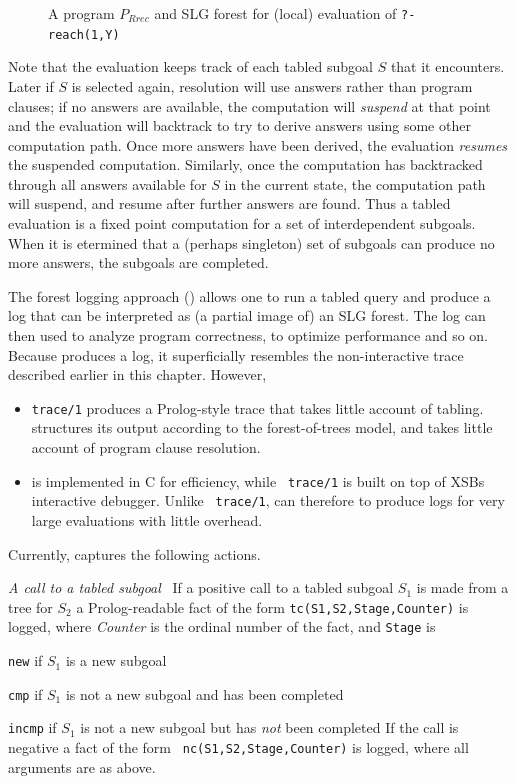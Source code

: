 \begin{example}
\begin{figure}[htbp]
\caption{A program $P_{Rrec}$ and SLG forest for (local) evaluation of
  {\tt ?- reach(1,Y)}} \label{fig:local}
\end{figure}
%
Note that the evaluation keeps track of each tabled subgoal $S$ that
it encounters.  Later if $S$ is selected again, resolution will use
answers rather than program clauses; if no answers are available, the
computation will {\em suspend} at that point and the evaluation will
backtrack to try to derive answers using some other computation path.
Once more answers have been derived, the evaluation {\em resumes} the
suspended computation.  Similarly, once the computation has
backtracked through all answers available for $S$ in the current
state, the computation path will suspend, and resume after further
answers are found.  Thus a tabled evaluation is a fixed point
computation for a set of interdependent subgoals.  When it is
etermined that a (perhaps singleton) set of subgoals can produce no
more answers, the subgoals are completed.
\end{example}


The forest logging approach ({\tt \ctrace}) allows one to run a tabled
query and produce a log that can be interpreted as (a partial image
of) an SLG forest.  The log can then used to analyze program
correctness, to optimize performance and so on.  Because \ctrace{}
  produces a log, it superficially resembles the non-interactive trace
  described earlier in this chapter.  However,
\begin{itemize}
\item {\tt trace/1} produces a Prolog-style trace that takes little
  account of tabling.  \ctrace{} structures its output according to
  the forest-of-trees model, and takes little account of program
  clause resolution.

\item \ctrace{} is implemented in C for efficiency, while {\tt
  trace/1} is built on top of XSBs interactive debugger.  Unlike {\tt
  trace/1}, \ctrace{} can therefore to produce logs for very large
  evaluations with little overhead.
\end{itemize}

Currently, \ctrace{} captures the following actions.

\bi
\item {\em A call to a tabled subgoal}~ If a positive call to a tabled
  subgoal $S_1$ is made from a tree for $S_2$ a Prolog-readable fact
  of the form {\tt tc(S1,S2,Stage,Counter)} is logged, where {\em
    Counter} is the ordinal number of the fact, and {\tt Stage} is
\bi
\item {\tt new} if $S_1$ is a new subgoal
\item {\tt cmp} if $S_1$ is not a new subgoal and has been completed
\item {\tt incmp} if $S_1$ is not a new subgoal but has {\em not} been
  completed 
\ei 
%
If the call is negative a fact of the form {\tt
  nc(S1,S2,Stage,Counter)} is logged, where all arguments are as
above.

